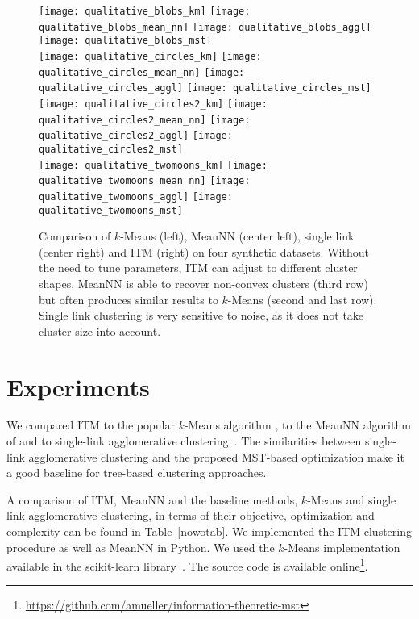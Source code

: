 \begin{figure}[t]
\centering
\texttt{[image: qualitative\_blobs\_km]}
\texttt{[image: qualitative\_blobs\_mean\_nn]}
\texttt{[image: qualitative\_blobs\_aggl]}
\texttt{[image: qualitative\_blobs\_mst]} \\ 

\texttt{[image: qualitative\_circles\_km]}
\texttt{[image: qualitative\_circles\_mean\_nn]}
\texttt{[image: qualitative\_circles\_aggl]}
\texttt{[image: qualitative\_circles\_mst]} \\ 

\texttt{[image: qualitative\_circles2\_km]}
\texttt{[image: qualitative\_circles2\_mean\_nn]}
\texttt{[image: qualitative\_circles2\_aggl]}
\texttt{[image: qualitative\_circles2\_mst]} \\ 

\texttt{[image: qualitative\_twomoons\_km]}
\texttt{[image: qualitative\_twomoons\_mean\_nn]}
\texttt{[image: qualitative\_twomoons\_aggl]}
\texttt{[image: qualitative\_twomoons\_mst]} \\ 
\caption{Comparison of $k$-Means (left), MeanNN (center left), single link
(center right) and ITM (right) on four synthetic datasets.  Without the need to
tune parameters, ITM can adjust to different cluster shapes.  MeanNN is able to
recover non-convex clusters (third row) but often produces similar results to
$k$-Means (second and last row). Single link clustering is very sensitive
to noise, as it does not take cluster size into account.}
\label{fig:qualitative}
\end{figure}

\section{Experiments}
We compared ITM to the popular $k$-Means algorithm 
\citep{macqueen1967some,lloyd1982least}, to the MeanNN algorithm of
\citet{faivishevsky2010nonparametric} and to single-link agglomerative
clustering~\citep{gower1969minimum}. The similarities between single-link
agglomerative clustering and the proposed MST-based optimization make it a 
good baseline for tree-based clustering approaches.

\enlargethispage{5mm}
A comparison of ITM, MeanNN and the baseline methods, $k$-Means and 
single link agglomerative clustering, in terms of their objective, 
optimization and complexity can be found in Table~\ref{nowotab}. 
We implemented the ITM clustering procedure as well as MeanNN in Python.  We
used the $k$-Means implementation available in the scikit-learn
library~\citep{pedregosa2011scikit}. The source
code is available online\footnote{\url{https://github.com/amueller/information-theoretic-mst}}.

